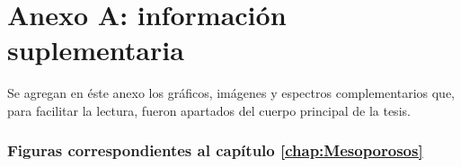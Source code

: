\cleardoublepage{}
{}
\FormatoAnexoA

\AddLabelsAxUno

\let\originalstyle=\thispagestyle            %
\def\thispagestyle#1{\fancyfoot[C]{}}       %
\def\thispagestyle#1{\originalstyle{empty}} %
\def\thispagestyle#1{}                       %

\renewcommand\thefigure{A.\arabic{figure}} 

\chapter*{Anexo A: información suplementaria}
    
    Se agregan en éste anexo los gráficos, imágenes y espectros complementarios que, para facilitar la lectura, fueron apartados del cuerpo principal de la tesis. 

    \subsection*{Figuras correspondientes al capítulo \ref{chap:Mesoporosos}}


